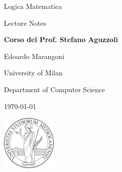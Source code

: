 \documentclass[12pt, a4paper,titlepage]{book}
\begin{document}
\pagestyle{fancy}
\renewcommand{\headrulewidth}{0pt} %
\renewcommand{\footrulewidth}{0pt} %
\renewcommand{\chaptermark}[1]{\markboth{#1}{}}
\fancyhead[LE]{\thepage \ \ }
\fancyhead[RO]{\MakeUppercase\leftmark \ \ \thepage}
\fancyfoot[C] {\thepage}



\frontmatter
\begin{titlepage}
  \centering
              \vspace*{6cm}
              \Huge{Logica Matematica}
  
              \vspace*{0.5cm}

           \Large{Lecture Notes} 

              \vspace*{0.5cm}

              \Large{\textbf{Corso del Prof. Stefano Aguzzoli}}
        
              \vspace*{2cm}

         \Large{Edoardo Marangoni}

              \vspace*{2cm}

              \small{University of Milan}

              \small{Department of Computer Science}

              \small{\today}
              
              \vspace*{2cm}
\includegraphics[width=0.2\textwidth]{images/unimi.png} 

\end{titlepage}

\tableofcontents    


\mainmatter
\pagestyle{fancy}
\renewcommand{\headrulewidth}{0pt}
\renewcommand{\chaptermark}[1]{\markboth{#1}{}}
\fancyhf{}
\fancyhead[LE]{\thepage \ \ \MakeUppercase\leftmark}
\fancyhead[RE, LO]{\MakeUppercase\chaptertitlename \ \ \thechapter}
\fancyhead[RO]{\rightmark \ \ \thepage}
\fancyfoot[C]{\thepage}
\end{document}
